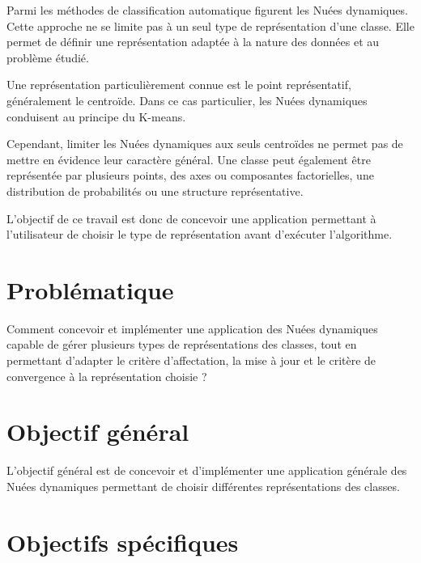 \documentclass[12pt,a4paper]{report}
\begin{document}
Parmi les méthodes de classification automatique figurent les
Nuées dynamiques. Cette approche ne se limite pas à un seul type de
représentation d'une classe. Elle permet de définir une représentation
adaptée à la nature des données et au problème étudié.

Une représentation particulièrement connue est le point représentatif,
généralement le centroïde. Dans ce cas particulier, les Nuées dynamiques
conduisent au principe du K-means.

Cependant, limiter les Nuées dynamiques aux seuls centroïdes ne permet
pas de mettre en évidence leur caractère général. Une classe peut
également être représentée par plusieurs points, des axes ou composantes
factorielles, une distribution de probabilités ou une structure
représentative.

L'objectif de ce travail est donc de concevoir une application permettant
à l'utilisateur de choisir le type de représentation avant d'exécuter
l'algorithme.


\section*{Problématique}

Comment concevoir et implémenter une application des Nuées dynamiques
capable de gérer plusieurs types de représentations des classes, tout
en permettant d'adapter le critère d'affectation, la mise à jour et
le critère de convergence à la représentation choisie ?


\section*{Objectif général}

L'objectif général est de concevoir et d'implémenter une application
générale des Nuées dynamiques permettant de choisir différentes
représentations des classes.

\section*{Objectifs spécifiques}
\end{document}
